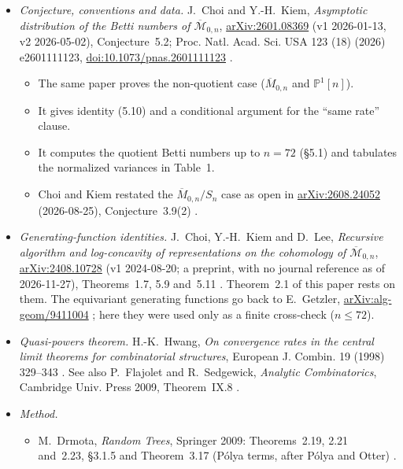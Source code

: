 \documentclass[11pt]{amsart}
\theoremstyle{definition}
\theoremstyle{remark}
\numberwithin{equation}{section}
\newcommand{\Mbar}{\overline{M}}
\newcommand{\PP}{\mathbb{P}}
\begin{document}
\begin{itemize}
\item \emph{Conjecture, conventions and data.} J.~Choi and Y.-H.~Kiem, \emph{Asymptotic distribution of the Betti numbers of \(\overline{\mathcal M}_{0,n}\)}, \href{https://arxiv.org/abs/2601.08369}{arXiv:2601.08369} (v1 2026-01-13, v2 2026-05-02), Conjecture~5.2; Proc. Natl. Acad. Sci. USA 123 (18) (2026) e2601111123, \href{https://doi.org/10.1073/pnas.2601111123}{doi:10.1073/pnas.2601111123} \cite{CK}.
  \begin{itemize}
  \item The same paper proves the non-quotient case (\(\Mbar_{0,n}\) and \(\PP^1[n]\)).
  \item It gives identity (5.10) and a conditional argument for the ``same rate'' clause.
  \item It computes the quotient Betti numbers up to \(n=72\) (\S5.1) and tabulates the normalized variances in Table~1.
  \item Choi and Kiem restated the \(\Mbar_{0,n}/S_n\) case as open in \href{https://arxiv.org/abs/2608.24052}{arXiv:2608.24052} (2026-08-25), Conjecture~3.9(2) \cite{CK2}.
  \end{itemize}
\item \emph{Generating-function identities.} J.~Choi, Y.-H.~Kiem and D.~Lee, \emph{Recursive algorithm and log-concavity of representations on the cohomology of \(\overline{\mathcal M}_{0,n}\)}, \href{https://arxiv.org/abs/2408.10728}{arXiv:2408.10728} (v1 2024-08-20; a preprint, with no journal reference as of 2026-11-27), Theorems~1.7, 5.9 and~5.11 \cite{CKL}. Theorem~2.1 of this paper rests on them. The equivariant generating functions go back to E.~Getzler, \href{https://arxiv.org/abs/alg-geom/9411004}{arXiv:alg-geom/9411004} \cite{Ge}; here they were used only as a finite cross-check (\(n\le72\)).
\item \emph{Quasi-powers theorem.} H.-K.~Hwang, \emph{On convergence rates in the central limit theorems for combinatorial structures}, European J. Combin. 19 (1998) 329--343 \cite{Hw}. See also P.~Flajolet and R.~Sedgewick, \emph{Analytic Combinatorics}, Cambridge Univ. Press 2009, Theorem~IX.8 \cite{FS}.
\item \emph{Method.}
  \begin{itemize}
  \item M.~Drmota, \emph{Random Trees}, Springer 2009: Theorems~2.19, 2.21 and~2.23, \S3.1.5 and Theorem~3.17 (P\'olya terms, after P\'olya and Otter) \cite{Dr}.

\end{itemize}
\end{itemize}
\end{document}
